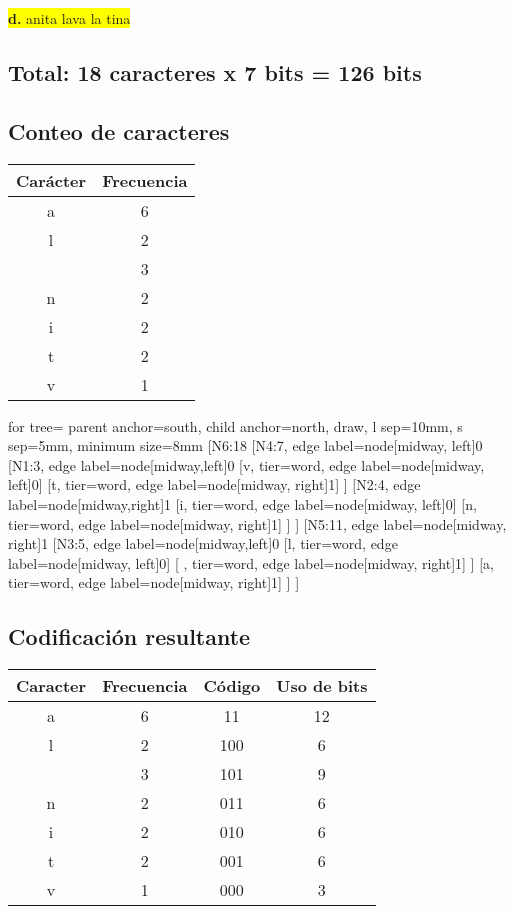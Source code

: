 \documentclass{article}
\begin{document}
	\vspace{0.5cm}
	\begin{center}
		\hspace{3cm}\colorbox{yellow}{{\textbf{d.} anita lava la tina}}\newline
		\subsection*{Total: 18 caracteres x 7 bits = 126 bits}
		\vspace{0.5cm}
		\subsection*{Conteo de caracteres}
		\begin{tabular}{c|c}
			\textbf{Carácter} & \textbf{Frecuencia} \\
			\hline
			a & 6 \\
			l & 2 \\
			  & 3 \\
			n & 2 \\
			i & 2 \\
			t & 2 \\
			v & 1 \\  
		\end{tabular}
		
		\vspace{1cm}
		
		\begin{forest}
			for tree={
				parent anchor=south,
				child anchor=north,
				draw,
				l sep=10mm,
				s sep=5mm,
				minimum size=8mm
			}
			[N6:18
				[N4:7, edge label={node[midway, left]{0}}
					[N1:3, edge label={node[midway,left]{0}}
						[v, tier=word, edge label={node[midway, left]{0}}]
						[t, tier=word, edge label={node[midway, right]{1}}]
					]
					[N2:4, edge label={node[midway,right]{1}}
					[i, tier=word, edge label={node[midway, left]{0}}]
					[n, tier=word, edge label={node[midway, right]{1}}]
					]
				]
				[N5:11, edge label={node[midway, right]{1}}
					[N3:5, edge label={node[midway,left]{0}}
						[l, tier=word, edge label={node[midway, left]{0}}]
						[ , tier=word, edge label={node[midway, right]{1}}]
				]
					[a, tier=word, edge label={node[midway, right]{1}}]
				]
			]
		\end{forest}
		
		
		\subsection*{Codificación resultante}
		\begin{tabular}{c|c|c|c}
			\textbf{Caracter} & \textbf{Frecuencia} & \textbf{Código} & \textbf{Uso de bits}\\
			\hline
			a & 6 & 11 & 12\\
			l & 2 & 100 & 6\\
			  & 3 & 101 & 9\\
			n & 2 & 011 & 6\\
			i & 2 & 010 & 6\\
			t & 2 & 001 & 6\\
			v & 1 & 000 & 3\\
		\end{tabular}

\end{center}
\end{document}
